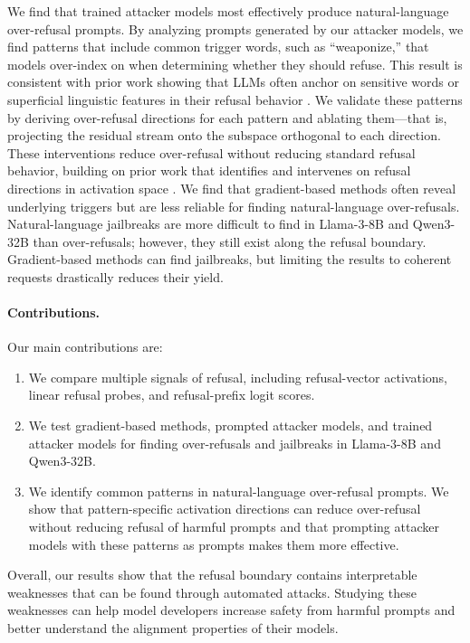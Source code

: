 \documentclass{article}
\begin{document}
We find that trained attacker models most effectively produce natural-language over-refusal prompts. By analyzing prompts generated by our attacker models, we find patterns that include common trigger words, such as ``weaponize,'' that models over-index on when determining whether they should refuse. This result is consistent with prior work showing that LLMs often anchor on sensitive words or superficial linguistic features in their refusal behavior \citep{rottger2024xstest,wu2025evorefuse}. We validate these patterns by deriving over-refusal directions for each pattern and ablating them---that is, projecting the residual stream onto the subspace orthogonal to each direction. These interventions reduce over-refusal without reducing standard refusal behavior, building on prior work that identifies and intervenes on refusal directions in activation space \citep{arditi2024refusal,wollschlager2025geometry}. We find that gradient-based methods often reveal underlying triggers but are less reliable for finding natural-language over-refusals. Natural-language jailbreaks are more difficult to find in Llama-3-8B and Qwen3-32B than over-refusals; however, they still exist along the refusal boundary. Gradient-based methods can find jailbreaks, but limiting the results to coherent requests drastically reduces their yield.

\paragraph{Contributions.}
Our main contributions are:
\begin{enumerate}
    \item We compare multiple signals of refusal, including refusal-vector activations, linear refusal probes, and refusal-prefix logit scores.
    \item We test gradient-based methods, prompted attacker models, and trained attacker models for finding over-refusals and jailbreaks in Llama-3-8B and Qwen3-32B.
    \item We identify common patterns in natural-language over-refusal prompts. We show that pattern-specific activation directions can reduce over-refusal without reducing refusal of harmful prompts and that prompting attacker models with these patterns as prompts makes them more effective.
\end{enumerate}

Overall, our results show that the refusal boundary contains interpretable weaknesses that can be found through automated attacks. Studying these weaknesses can help model developers increase safety from harmful prompts and better understand the alignment properties of their models.
\end{document}
